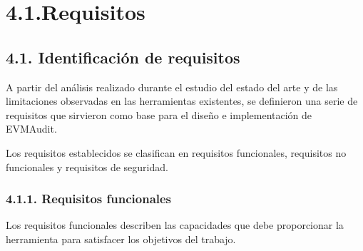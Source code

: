 \section{4.1.Requisitos}\label{requisitos}

\subsection{4.1. Identificación de
requisitos}\label{identificaciuxf3n-de-requisitos}

A partir del análisis realizado durante el estudio del estado del arte y
de las limitaciones observadas en las herramientas existentes, se
definieron una serie de requisitos que sirvieron como base para el
diseño e implementación de EVMAudit.

Los requisitos establecidos se clasifican en requisitos funcionales,
requisitos no funcionales y requisitos de seguridad.

\subsubsection{4.1.1. Requisitos
funcionales}\label{requisitos-funcionales}

Los requisitos funcionales describen las capacidades que debe
proporcionar la herramienta para satisfacer los objetivos del trabajo.


